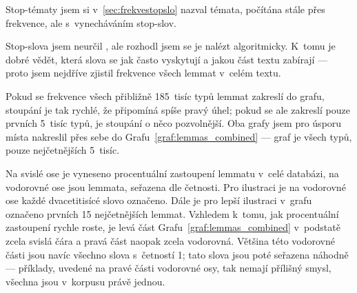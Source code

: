 \documentclass[12pt,a4paper]{report}
\begin{document}


Stop-tématy jsem si v~\ref{sec:frekvestopslo} nazval témata, počítána stále  přes frekvence, ale s~vynecháváním stop-slov.

Stop-slova jsem neurčil , ale rozhodl jsem se je nalézt algoritmicky. K~tomu je dobré vědět, která slova se jak často vyskytují a jakou část textu zabírají --- proto jsem nejdříve zjistil frekvence všech lemmat v~celém textu. 

Pokud se frekvence všech přibližně 185~tisíc typů lemmat zakreslí do grafu, stoupání je tak rychlé, že připomíná spíše pravý úhel; pokud se ale zakreslí pouze prvních 5~tisíc typů, je stoupání o něco pozvolnější. Oba grafy jsem pro úsporu místa nakreslil přes sebe do Grafu~\ref{graf:lemmas_combined} ---  graf je všech typů,  pouze nejčetnějších 5~tisíc.

Na svislé ose je vyneseno procentuální zastoupení lemmatu v~celé databázi, na vodorovné ose jsou lemmata, seřazena dle četnosti. Pro ilustraci je na vodorovné ose každé dvacetitisícé slovo označeno. Dále je pro lepší ilustraci v~grafu označeno prvních 15 nejčetnějších lemmat. Vzhledem k~tomu, jak procentuální zastoupení rychle roste, je levá část Grafu~\ref{graf:lemmas_combined} v~podstatě zcela svislá čára a pravá část naopak zcela vodorovná. Většina této vodorovné části jsou navíc všechno slova s~četností 1; tato slova jsou poté seřazena náhodně --- příklady, uvedené na pravé části vodorovné osy, tak nemají přílišný smysl, všechna jsou v~korpusu právě jednou.
\end{document}
